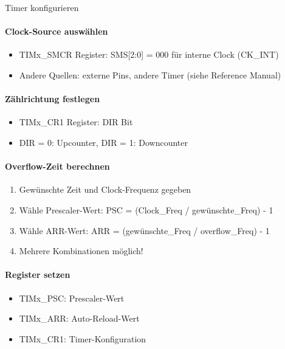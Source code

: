 \begin{KR}{Timer konfigurieren}\\
    \paragraph{Clock-Source auswählen}
    \begin{itemize}
        \item TIMx\_SMCR Register: SMS[2:0] = 000 für interne Clock (CK\_INT)
        \item Andere Quellen: externe Pins, andere Timer (siehe Reference Manual)
    \end{itemize}
    
    \paragraph{Zählrichtung festlegen}
    \begin{itemize}
        \item TIMx\_CR1 Register: DIR Bit
        \item DIR = 0: Upcounter, DIR = 1: Downcounter
    \end{itemize}
    
    \paragraph{Overflow-Zeit berechnen}
    \begin{enumerate}
        \item Gewünschte Zeit und Clock-Frequenz gegeben
        \item Wähle Prescaler-Wert: PSC = (Clock\_Freq / gewünschte\_Freq) - 1
        \item Wähle ARR-Wert: ARR = (gewünschte\_Freq / overflow\_Freq) - 1
        \item Mehrere Kombinationen möglich!
    \end{enumerate}
    
    \paragraph{Register setzen}
    \begin{itemize}
        \item TIMx\_PSC: Prescaler-Wert
        \item TIMx\_ARR: Auto-Reload-Wert
        \item TIMx\_CR1: Timer-Konfiguration
    \end{itemize}
\end{KR}

